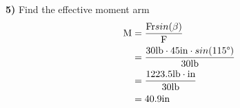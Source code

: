 \documentclass[12pt]{article}
\begin{document}
\begin{tcolorbox}[
  standard jigsaw, %
  colframe=fg,
  boxrule=1px,
  colback=black,
  opacityback=0,
  sharp corners,
  coltext=fg
  ]
  \textbf{5)} Find the effective moment arm
  \begin{align*}
    \textup{M} &= \frac{\textup{Fr}sin(\beta)}{\textup{F}} \\
               &= \frac{30 \textup{lb} \cdot 45 \textup{in} \cdot sin(115 \degree)}{30 \textup{lb}} \\
               &= \frac{1223.5 \textup{lb} \cdot \textup{in}}{30 \textup{lb}} \\
               &= 40.9 \textup{in}
  \end{align*}
\end{tcolorbox}
\end{document}
